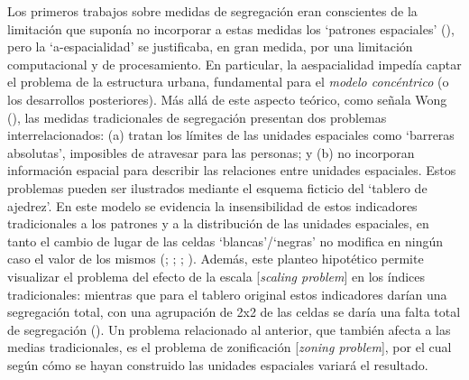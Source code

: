 \documentclass[
  spanish,
  a4paper,%
  chapterprefix=true,%
  DIV=calc,%
  twoside]{scrbook}%
\begin{document}
Los primeros trabajos sobre medidas de segregación eran conscientes de
la limitación que suponía no incorporar a estas medidas los `patrones
espaciales' (), pero la `a-espacialidad' se
justificaba, en gran medida, por una limitación computacional y de
procesamiento. En particular, la aespacialidad impedía captar el
problema de la estructura urbana, fundamental para el \emph{modelo
concéntrico} (o los desarrollos posteriores). Más allá de este aspecto
teórico, como señala Wong (), las medidas tradicionales de
segregación presentan dos problemas interrelacionados: (a) tratan los
límites de las unidades espaciales como `barreras absolutas', imposibles
de atravesar para las personas; y (b) no incorporan información espacial
para describir las relaciones entre unidades espaciales. Estos problemas
pueden ser ilustrados mediante el esquema ficticio del `tablero de
ajedrez'. En este modelo se evidencia la insensibilidad de estos
indicadores tradicionales a los patrones y a la distribución de las
unidades espaciales, en tanto el cambio de lugar de las celdas
`blancas'/`negras' no modifica en ningún caso el valor de los mismos
(; ; ; ). Además, este
planteo hipotético permite visualizar el problema del efecto de la
escala {[}\emph{scaling problem}{]} en los índices tradicionales: mientras que
para el tablero original estos indicadores darían una segregación total,
con una agrupación de 2x2 de las celdas se daría una falta total de
segregación (). Un problema relacionado al anterior, que
también afecta a las medias tradicionales, es el problema de
zonificación {[}\emph{zoning problem}{]}, por el cual según cómo se hayan
construido las unidades espaciales variará el resultado.
\end{document}
